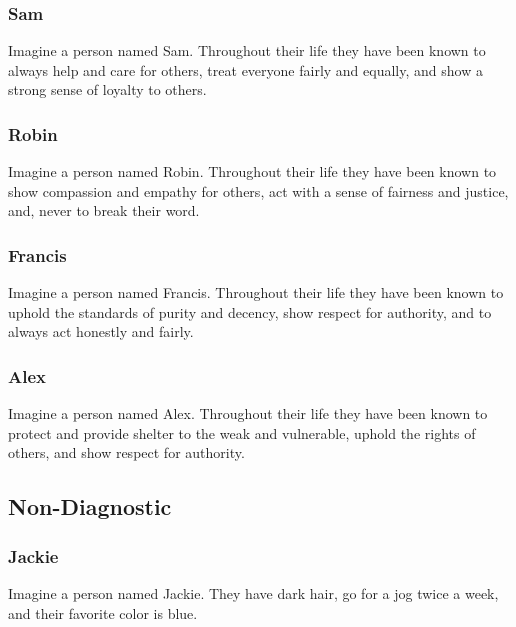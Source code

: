 \documentclass[
  american,
  man,mask,floatsintext]{apa6}
\begin{document}
\hypertarget{sam-1}{%
\subsubsection{Sam}\label{sam-1}}

Imagine a person named Sam.
Throughout their life they have been known to always help and care for others, treat everyone fairly and equally, and show a strong sense of loyalty to others.

\hypertarget{robin-1}{%
\subsubsection{Robin}\label{robin-1}}

Imagine a person named Robin.
Throughout their life they have been known to show compassion and empathy for others, act with a sense of fairness and justice, and, never to break their word.

\hypertarget{francis-1}{%
\subsubsection{Francis}\label{francis-1}}

Imagine a person named Francis.
Throughout their life they have been known to uphold the standards of purity and decency, show respect for authority, and to always act honestly and fairly.

\hypertarget{alex-1}{%
\subsubsection{Alex}\label{alex-1}}

Imagine a person named Alex.
Throughout their life they have been known to protect and provide shelter to the weak and vulnerable, uphold the rights of others, and show respect for authority.

\hypertarget{non-diagnostic}{%
\subsection{Non-Diagnostic}\label{non-diagnostic}}

\hypertarget{jackie-1}{%
\subsubsection{Jackie}\label{jackie-1}}

Imagine a person named Jackie.
They have dark hair, go for a jog twice a week, and their favorite color is blue.
\end{document}
